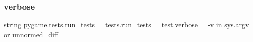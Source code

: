 \subsubsection{\texorpdfstring{verbose}{verbose}}
{\footnotesize\ttfamily string pygame.\+tests.\+run\+\_\+tests\+\_\+\+\_\+tests.\+run\+\_\+tests\+\_\+\+\_\+test.\+verbose = \textquotesingle{}-\/v\textquotesingle{} in sys.\+argv or \hyperlink{namespacepygame_1_1tests_1_1run__tests____tests_1_1run__tests____test_a9aab2705df0f009bbf08eb8c7c82ad37}{unnormed\+\_\+diff}}

